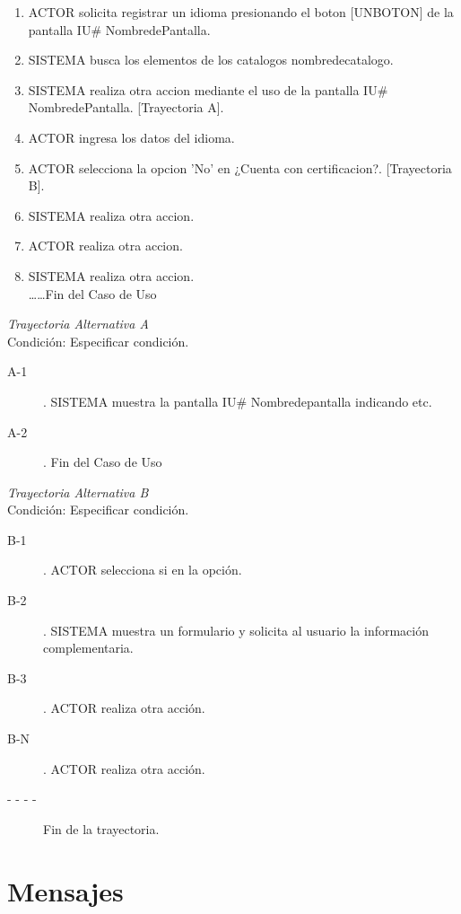 \documentclass[10pt,letterpaper]{article}
\begin{document}
\begin{enumerate}
  \item ACTOR solicita registrar un idioma presionando el boton [UNBOTON] de la pantalla IU\# NombredePantalla.
  \item SISTEMA busca los elementos de los catalogos nombredecatalogo.
  \item SISTEMA realiza otra accion mediante el uso de la pantalla IU\# NombredePantalla. [Trayectoria A].
  \item ACTOR ingresa los datos del idioma.
  \item ACTOR selecciona la opcion 'No' en ¿Cuenta con certificacion?. [Trayectoria B].
  \item SISTEMA realiza otra accion.
  \item ACTOR realiza otra accion.
  \item SISTEMA realiza otra accion.\\
  \ldots \ldots Fin del Caso de Uso\\
\end{enumerate}

\textit{Trayectoria Alternativa A}\\
Condición: Especificar condición.\\
\begin{description}
\item [A-1]. SISTEMA muestra la pantalla IU\# Nombredepantalla indicando etc.
\item [A-2]. Fin del Caso de Uso\\
\end{description}
\newpage
\textit{Trayectoria Alternativa B}\\
Condición: Especificar condición.\\
\begin{description}
\item [B-1]. ACTOR selecciona si en la opción.
\item [B-2]. SISTEMA muestra un formulario y solicita al usuario la información complementaria.
\item [B-3]. ACTOR realiza otra acción.
\item [B-N]. ACTOR realiza otra acción.
\item [- - - -]Fin de la trayectoria.
\end{description}

\section{Mensajes}
\end{document}
